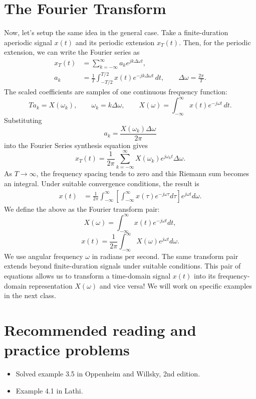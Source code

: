 \section{The Fourier Transform}
Now, let's setup the same idea in the general case. Take a finite-duration aperiodic signal $x(t)$ and its periodic
extension $x_T(t)$.
Then, for the periodic extension, we can write the Fourier series as
\begin{align*}
    x_T(t) &= \sum_{k=-\infty}^{\infty} a_k e^{jk\Delta\omega t}, \\
    a_k  &= \frac{1}{T}\int_{-T/2}^{T/2}x(t)e^{-jk\Delta\omega t}\,dt,
    \qquad \Delta\omega=\frac{2\pi}{T}.
\end{align*}
The scaled coefficients are samples of one continuous frequency function:
\[
T a_k =X(\omega_k),\qquad \omega_k=k\Delta\omega,\qquad
X(\omega)=\int_{-\infty}^{\infty}x(t)e^{-j\omega t}\,dt.
\]
Substituting \[a_k=\frac{X(\omega_k)\Delta\omega}{2\pi}\] into the Fourier Series synthesis equation gives
\[
x_T(t)=\frac{1}{2\pi}\sum_{k=-\infty}^{\infty}
X(\omega_k)e^{j\omega_k t}\Delta\omega.
\]
As $T\to\infty$, the frequency spacing tends to zero and this Riemann sum
becomes an integral. Under suitable convergence conditions, the result is
\begin{align*}
    x(t) &= \frac{1}{2\pi} \int_{-\infty}^{\infty} \left[ \int_{-\infty}^{\infty} x(\tau) e^{-j\omega \tau} d\tau \right] e^{j\omega t} d\omega.
\end{align*}
We define the above as the Fourier transform pair:
\[
X(\omega) = \int_{-\infty}^{\infty} x(t) e^{-j\omega t} dt,
\]
\[
x(t) = \frac{1}{2\pi} \int_{-\infty}^{\infty} X(\omega) e^{j\omega t} d\omega.
\]
We use angular frequency $\omega$ in radians per second. The same transform
pair extends beyond finite-duration signals under suitable conditions.
This pair of equations allows us to transform a time-domain signal $x(t)$ into its frequency-domain representation $X(\omega)$ and vice versa! We will work on specific examples in the next class.

\section{Recommended reading and practice problems}
\begin{itemize}
    \item Solved example 3.5 in Oppenheim and Willsky, 2nd edition.
    \item Example 4.1 in Lathi.
\end{itemize}
